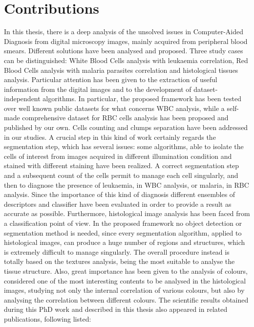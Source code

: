 \documentclass[final,a4paper,12pt,english]{UnicaPhdThesis3}
\begin{document}
	\section{Contributions} %
	In this thesis, there is a deep analysis of the unsolved issues in Computer-Aided Diagnosis from digital microscopy images, mainly acquired from peripheral blood smears. Different solutions have been analysed and proposed. Three study cases can be distinguished: White Blood Cells analysis with leukaemia correlation, Red Blood Cells analysis with malaria parasites correlation and histological tissues analysis. Particular attention has been given to the extraction of useful information from the digital images and to the development of dataset-independent algorithms. In particular, the proposed framework has been tested over well known public datasets for what concerns WBC analysis, while a self-made comprehensive dataset for RBC cells analysis has been proposed and published by our own. Cells counting and clumps separation have been addressed in our studies. A crucial step in this kind of work certainly regards the segmentation step, which has several issues: some algorithms, able to isolate the cells of interest from images acquired in different illumination condition and stained with different staining have been realized. A correct segmentation step and a subsequent count of the cells permit to manage each cell singularly, and then to diagnose the presence of leukaemia, in WBC analysis, or malaria, in RBC analysis. Since the importance of this kind of diagnosis different ensembles of descriptors and classifier have been evaluated in order to provide a result as accurate as possible. Furthermore, histological image analysis has been faced from a classification point of view. In the proposed framework no object detection or segmentation method is needed, since every segmentation algorithm, applied to histological images, can produce a huge number of regions and structures, which is extremely difficult to manage singularly. The overall procedure instead is totally based on the textures analysis, being the most suitable to analyse the tissue structure. Also, great importance has been given to the analysis of colours, considered one of the most interesting contents to be analysed in the histological images, studying not only the internal correlation of various colours, but also by analysing the correlation between different colours.
	The scientific results obtained during this PhD work and described in this thesis also appeared in related publications, following listed:
\end{document}
